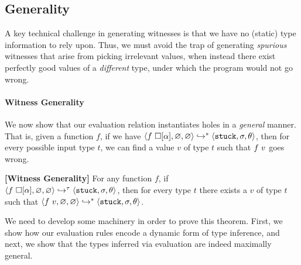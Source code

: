
%
\subsection{Generality}\label{sec:soundness}

A key technical challenge in generating witnesses is
that we have no (static) type information to rely upon. Thus, we
must avoid the trap of generating \emph{spurious} witnesses that
arise from picking irrelevant values, when instead there exist
perfectly good values of a \emph{different} type, under which
the program would not go wrong.

\paragraph{Witness Generality}
We now show that our evaluation relation instantiates holes in a
\emph{general} manner. That is, given a function $f$, if we have
$\langle f\ \square[\alpha], \varnothing, \varnothing \rangle \hookrightarrow^{*} \langle \mathtt{stuck}, \sigma, \theta \rangle$,
then for every possible input type $t$, we can find a value
$v$ of type $t$ such that $f\ v$ goes wrong.

\begin{thm}{\textbf{[Witness Generality]}}
\label{thm:soundness}
  For any function $f$, if\\
  \hbox{$\langle f\ \square[\alpha], \varnothing, \varnothing \rangle \hookrightarrow^{\tau} \langle \mathtt{stuck}, \sigma, \theta \rangle$,}
  then for every %
  type
  $t$ there exists a $v$ of type $t$ such that
  $\langle f\ v, \varnothing, \varnothing \rangle \hookrightarrow^{*} \langle \mathtt{stuck}, \sigma, \theta \rangle$.
\end{thm}

We need to develop some machinery in order to prove this theorem.
First, we show how our evaluation rules encode a dynamic form of
type inference, and next, we show that the types inferred via
evaluation are indeed maximally general.

